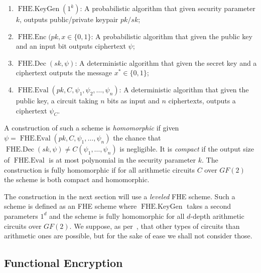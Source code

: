 \documentclass[11pt, a4paper]{article}
\newcommand{\op}[1]{\operatorname{#1}}
\begin{document}
\begin{enumerate}
    \item $\op{FHE.KeyGen}(1^k)$: A probabilistic algorithm that given security parameter $k$, outputs public/private keypair $pk/sk$;
    \item $\op{FHE.Enc}(pk, x \in \{0,1\}$: A probabilistic algorithm that given the public key and an input bit outputs ciphertext $\psi$;
    \item $\op{FHE.Dec}(sk, \psi)$: A deterministic algorithm that given the secret key and a ciphertext outputs the message $x^* \in \{0,1\}$;
    \item $\op{FHE.Eval}(pk, C, \psi_1, \psi_2, \dots, \psi_n)$: A deterministic algorithm that given the public key, a circuit taking $n$ bits as input and $n$ ciphertexts, outputs a ciphertext $\psi_C$.
\end{enumerate}

A construction of such a scheme is \emph{homomorphic} if given $\psi = \op{FHE.Eval}(pk, C, \psi_1, \dots, \psi_n)$ the chance that $\op{FHE.Dec}(sk, \psi) \neq C(\psi_1, \dots, \psi_n)$ is negligible. 
It is \emph{compact} if the output size of $\op{FHE.Eval}$ is at most polynomial in the security parameter $k$.
The construction is fully homomorphic if for all arithmetic circuits $C$ over $GF(2)$ the scheme is both compact and homomorphic.

The construction in the next section will use a \emph{leveled} FHE scheme. 
Such a scheme is defined as an FHE scheme where $\op{FHE.KeyGen}$ takes a second parameters $1^d$ and the scheme is fully homomorphic for all $d$-depth arithmetic circuits over $GF(2)$. 
We suppose, as per~\cite{vaikuntanathan2011computing}, that other types of circuits than arithmetic ones are possible, but for the sake of ease we shall not consider those.

\subsection{Functional Encryption}
\end{document}
